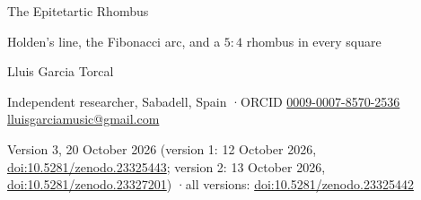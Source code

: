 \documentclass[11pt,a4paper]{article}
\theoremstyle{plain}
\theoremstyle{definition}
\theoremstyle{remark}
\begin{document}
\begin{center}
{\LARGE The Epitetartic Rhombus\par}
\vspace{0.3em}
{\large Holden's line, the Fibonacci arc, and a $5:4$ rhombus in every square\par}
\vspace{1.2em}
{\large Lluis Garcia Torcal\par}
\vspace{0.3em}
{\small Independent researcher, Sabadell, Spain \quad·\quad ORCID \href{https://orcid.org/0009-0007-8570-2536}{0009-0007-8570-2536}\\ \href{mailto:lluisgarciamusic@gmail.com}{lluisgarciamusic@gmail.com}\par}
\vspace{0.3em}
{\small Version 3, 20 October 2026 (version 1: 12 October 2026, \href{https://doi.org/10.5281/zenodo.23325443}{doi:10.5281/zenodo.23325443}; version 2: 13 October 2026, \href{https://doi.org/10.5281/zenodo.23327201}{doi:10.5281/zenodo.23327201}) \quad·\quad all versions: \href{https://doi.org/10.5281/zenodo.23325442}{doi:10.5281/zenodo.23325442}\par}
\end{center}
\end{document}

